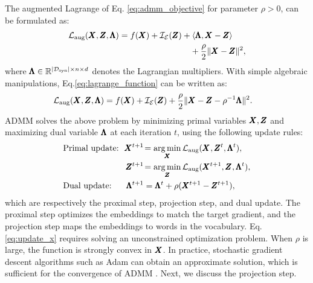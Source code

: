%
%
The augmented Lagrange of Eq. \ref{eq:admm_objective} for parameter $\rho > 0$, can be formulated as: 
%
\begin{align}\label{eq:lagrange_function}
    {\mathcal{L}}_\text{aug}(\pmb{X}, \pmb{Z}, \pmb{\Lambda}) = f(\pmb{X}) +{\mathcal{I}}_{\mathcal{E}}(\pmb{Z}) &+ \langle \pmb{\Lambda}, \pmb{X} - \pmb{Z} \rangle \nonumber \\
    &~~~+ \frac{\rho}{2} \| \pmb{X} - \pmb{Z} \|^2,
\end{align}
where $\pmb{\Lambda} \in {\mathbb{R}}^{|{\mathcal{D}}_\text{syn}| \times n \times d}$ denotes the Lagrangian multipliers.
%
With simple algebraic manipulations, Eq.\ref{eq:lagrange_function} can be written as:
\begin{align}\label{eq:lagrange_alter}
    {\mathcal{L}}_\text{aug}(\pmb{X}, \pmb{Z}, \pmb{\Lambda}) = f(\pmb{X}) +{\mathcal{I}}_{\mathcal{E}}(\pmb{Z}) &+ 
    \frac{\rho}{2} \| \pmb{X} - \pmb{Z} - \rho^{-1}\pmb{\Lambda} \|^2. 
\end{align}
%
%
ADMM solves the above problem %
by minimizing primal variables $\pmb{X},\pmb{Z}$ and maximizing dual variable $\pmb{\Lambda}$ at each iteration $t$, using the following update rules:
\begin{align}
    &\text{Primal update:}\!\!&\pmb{X}^{t+1} &\!= \operatorname*{arg\,min}_{\pmb{X}} {\mathcal{L}}_\text{aug}(\pmb{X}^{}, \pmb{Z}^{t}, \pmb{\Lambda}^t) \label{eq:update_x}, \\
    & &\pmb{Z}^{t+1} &\!= \operatorname*{arg\,min}_{\pmb{Z}} {\mathcal{L}}_\text{aug}(\pmb{X}^{t+1}, \pmb{Z}^{}, \pmb{\Lambda}^t) \label{eq:update_z}, \\
    &\text{Dual update:} &\pmb{\Lambda}^{t+1} &= \pmb{\Lambda}^t + \rho (\pmb{X}^{t+1} - \pmb{Z}^{t+1}), \label{eq:update_lambda}
\end{align}
which are respectively the proximal step, projection step, and dual update.
The proximal step optimizes the embeddings to match the target gradient, and the projection step maps the embeddings to words in the vocabulary.
%
%
Eq. \ref{eq:update_x} requires solving an unconstrained optimization problem. When $\rho$ is large, the function is strongly convex in $\pmb{X}$. 
In practice, stochastic gradient descent algorithms such as Adam \cite{kingma2014adam} can obtain an approximate solution, which is sufficient for the convergence of ADMM \cite{huang2021alternating}.
Next, we discuss the projection step.


